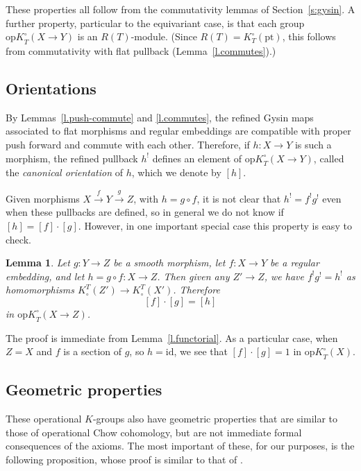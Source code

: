 \documentclass[11pt]{amsart}
\newtheorem{lemma}[theorem]{Lemma}
\theoremstyle{definition}
\begin{document}
These properties all follow from the commutativity lemmas of Section~\ref{s:gysin}.  A further property, particular to the equivariant case, is that each group ${\mathrm{op}K}_T^\circ(X \to Y)$ is an $R(T)$-module.  (Since $R(T) = K_T^\circ({\mathrm{pt}})$, this follows from commutativity with flat pullback (Lemma~\ref{l.commutes}).)

\subsection{Orientations}

By Lemmas~\ref{l.push-commute} and \ref{l.commutes}, the refined Gysin maps associated to flat morphisms and regular embeddings are compatible with proper push forward and commute with each other.  Therefore, if $h \colon X \rightarrow Y$ is such a morphism, the refined pullback $h^!$ defines an element of ${\mathrm{op}K}^\circ_T(X \rightarrow Y)$, called the \emph{canonical orientation} of $h$, which we denote by $[h]$.

Given morphisms $X \xrightarrow{f} Y \xrightarrow{g} Z$, with $h=g\circ f$, it is not clear that $h^! = f^!g^!$ even when these pullbacks are defined, so in general we do not know if $[h] = [f]\cdot [g]$.  However, in one important special case this property is easy to check.

\begin{lemma}\label{l.sections}
Let $g\colon Y \to Z$ be a smooth morphism, let $f\colon X \to Y$ be a regular embedding, and let $h = g\circ f\colon X \to Z$.  Then given any $Z' \to Z$, we have $f^! g^! = h^!$ as homomorphisms $K^T_\circ(Z') \to K^T_\circ(X')$.  Therefore
\[
[f]\cdot[g] = [h]
\]
in ${\mathrm{op}K}_T^\circ(X \to Z)$.
\end{lemma}

The proof is immediate from Lemma~\ref{l.functorial}.  As a particular case, when $Z=X$ and $f$ is a section of $g$, so $h={\mathrm{id}}$, we see that $[f]\cdot [g] = 1$ in ${\mathrm{op}K}_T^\circ(X)$.

\subsection{Geometric properties}

These operational $K$-groups also have geometric properties that are similar to those of operational Chow cohomology, but are not immediate formal consequences of the axioms.  The most important of these, for our purposes, is the following proposition, whose proof is similar to that of \cite[Proposition~17.4.2]{it}.
\end{document}
